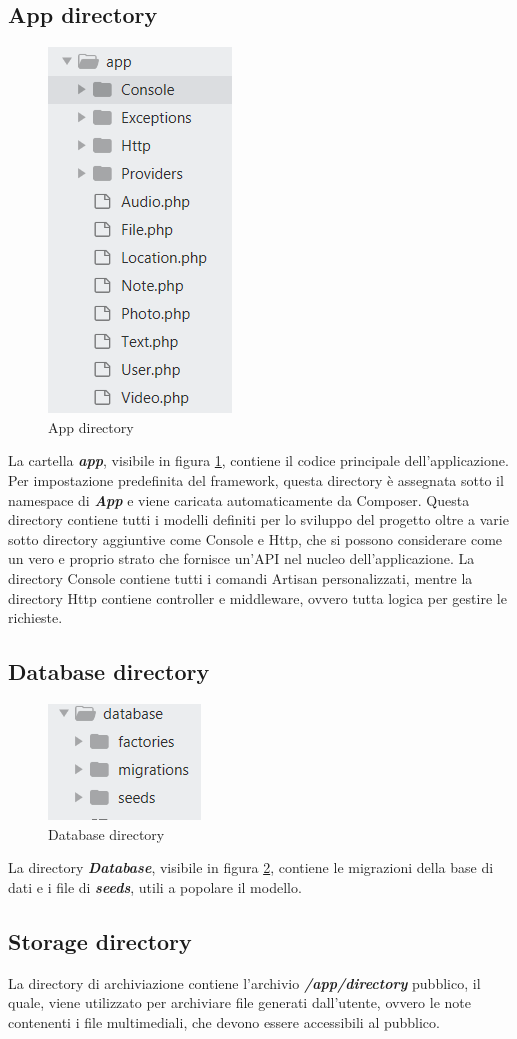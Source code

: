\subsection{App directory}
\begin{figure}[H]
	\centering
	\includegraphics[width=0.15\linewidth, height=0.2\textheight]{AppDirectory}
	\caption{App directory}
	\label{fig:AppDirectory}
\end{figure}
La cartella \textit{\textbf{app}}, visibile in figura \ref{fig:AppDirectory}, contiene il codice principale dell'applicazione. Per impostazione predefinita del framework, questa directory è assegnata sotto il namespace di \textit{\textbf{App}} e viene caricata automaticamente da Composer.
Questa directory contiene tutti i modelli definiti per lo sviluppo del progetto oltre a varie sotto directory aggiuntive come Console e Http, che si possono considerare come un vero e proprio strato che fornisce un'API nel nucleo dell'applicazione.
La directory Console contiene tutti i comandi Artisan personalizzati, mentre la directory Http contiene controller e middleware, ovvero tutta logica per gestire le richieste.

\subsection{Database directory}
\begin{figure}[H]
	\centering
	\includegraphics[width=0.2\linewidth, height=0.1\textheight]{DatabaseDirectory}
	\caption{Database directory}
	\label{fig:DBDirectory}
\end{figure}

La directory \textit{\textbf{Database}}, visibile in figura \ref{fig:DBDirectory}, contiene le migrazioni della base di dati e i file di \textit{\textbf{seeds}}, utili a popolare il modello.

\subsection{Storage directory}
La directory di archiviazione contiene l'archivio \textit{\textbf{/app/directory}} pubblico, il quale, viene utilizzato per archiviare file generati dall'utente, ovvero le note contenenti i file multimediali, che devono essere accessibili al pubblico. 
\vspace{-9px}
